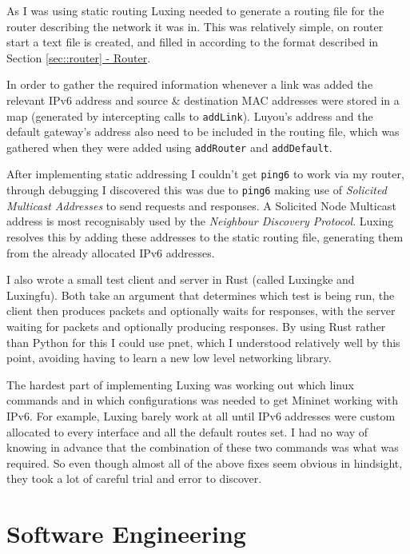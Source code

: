 \documentclass[12pt,a4paper,twoside,openany]{report}
\begin{document}
\bigskip

As I was using static routing Luxing needed to generate a routing file for the router describing the network it was in.  This was relatively simple, on router start a text file is created, and filled in according to the format described in Section \ref{sec::router}\hyperref[sec::router]{ - Router}.  

In order to gather the required information whenever a link was added the relevant IPv6 address and source \& destination MAC addresses were stored in a map (generated by intercepting calls to \verb!addLink!).  Luyou's address and the default gateway's address also need to be included in the routing file, which was gathered when they were added using \verb!addRouter! and \verb!addDefault!.

\bigskip

After implementing static addressing I couldn't get \verb!ping6! to work via my router, through debugging I discovered this was due to \verb!ping6! making use of \textit{Solicited Multicast Addresses} to send requests and responses. A Solicited Node Multicast address is most recognisably used by the \textit{Neighbour Discovery Protocol}\cite{ndp_rfc}. Luxing resolves this by adding these addresses to the static routing file, generating them from the already allocated IPv6 addresses.

\bigskip

I also wrote a small test client and server in Rust (called Luxingke and Luxingfu).  Both take an argument that determines which test is being run, the client then produces packets and optionally waits for responses, with the server waiting for packets and optionally producing responses.  By using Rust rather than Python for this I could use pnet, which I understood relatively well by this point, avoiding having to learn a new low level networking library.

\bigskip

The hardest part of implementing Luxing was working out which linux commands and in which configurations was needed to get Mininet working with IPv6.  For example, Luxing barely work at all until IPv6 addresses were custom allocated to every interface and all the default routes set.  I had no way of knowing in advance that the combination of these two commands was what was required.  So even though almost all of the above fixes seem obvious in hindsight, they took a lot of careful trial and error to discover.

\section{Software Engineering}
\label{sec::soft_eng}
\end{document}
